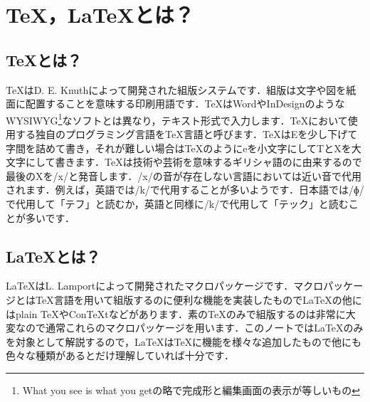 \section{\TeX，\LaTeX とは？}
\subsection{\TeX とは？}
\TeX はD. E. Knuthによって開発された組版システムです．組版は文字や図を紙面に配置することを意味する印刷用語です．\TeX はWordやInDesignのようなWYSIWYG\footnote{What you see is what you getの略で完成形と編集画面の表示が等しいもの}なソフトとは異なり，テキスト形式で入力します．\TeX において使用する独自のプログラミング言語を\TeX 言語と呼びます．\TeX はEを少し下げて字間を詰めて書き，それが難しい場合はTeXのようにeを小文字にしてTとXを大文字にして書きます．\TeX は技術や芸術を意味するギリシャ語のに由来するので最後のXを/x/と発音します．/x/の音が存在しない言語においては近い音で代用されます．例えば，英語では/k/で代用することが多いようです．日本語では/ɸ/で代用して「テフ」と読むか，英語と同様に/k/で代用して「テック」と読むことが多いです．
\subsection{\LaTeX とは？}
\LaTeX はL. Lamportによって開発されたマクロパッケージです．マクロパッケージとは\TeX 言語を用いて組版するのに便利な機能を実装したもので\LaTeX の他にはplain \TeX やCon\TeX tなどがあります．素の\TeX のみで組版するのは非常に大変なので通常これらのマクロパッケージを用います．このノートでは\LaTeX のみを対象として解説するので，\LaTeX は\TeX に機能を様々な追加したもので他にも色々な種類があるとだけ理解していれば十分です．